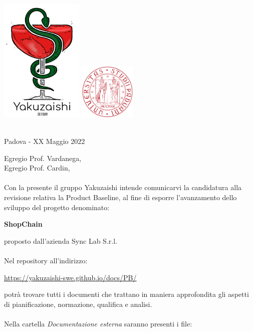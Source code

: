 \documentclass[a4paper, 10pt]{article}
\begin{document}
\begin{center}
\includegraphics[width=0.3\textwidth]{../template/images/logo.png}
\hspace{3cm}
\includegraphics[width=0.2\textwidth]{../template/images/logoUnipd.png}\\
\end{center}
\begin{flushright}
    \
    \textbf{}\\
    Padova - XX Maggio 2022
\end{flushright}
Egregio Prof. Vardanega,\\
Egregio Prof. Cardin,\\\\
Con la presente il gruppo Yakuzaishi intende comunicarvi la candidatura alla revisione relativa la Product Baseline, al fine di esporre l’avanzamento dello sviluppo del progetto denominato:
\begin{center}
    \textbf{ShopChain}
\end{center}
proposto dall'azienda Sync Lab S.r.l.\\\\
Nel repository all'indirizzo:
\begin{center}
    \href{https://yakuzaishi-swe.github.io/docs/PB/}{\underline{https://yakuzaishi-swe.github.io/docs/PB/}}\\ 
\end{center}
potrà trovare tutti i documenti che trattano in maniera approfondita gli aspetti di pianificazione, normazione, qualifica e analisi.\\\\
Nella cartella \textit{Documentazione esterna} saranno presenti i file:
\end{document}
